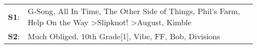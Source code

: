 \begin{supertabular}{p{0.03\textwidth}p{0.92\textwidth}}
 \textbf{S1}:  &  G-Song\textsuperscript{}, \enspace All In Time\textsuperscript{}, \enspace The Other Side of Things\textsuperscript{}, \enspace Phil's Farm\textsuperscript{}, \enspace Help On the Way\textsuperscript{} \textgreater \enspace Slipknot!\textsuperscript{} \textgreater \enspace August\textsuperscript{}, \enspace Kimble\textsuperscript{}  \enspace  \\
 \textbf{S2}:  &                                                                                                                                 Much Obliged\textsuperscript{}, \enspace 10th Grade[1]\textsuperscript{}, \enspace Vibe\textsuperscript{}, \enspace FF\textsuperscript{}, \enspace Bob\textsuperscript{}, \enspace Divisions\textsuperscript{}  \enspace  \\
\end{supertabular}
